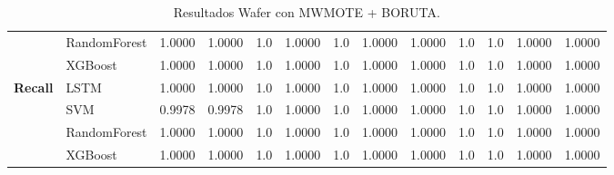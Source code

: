 \begin{table}[h]
\begin{adjustbox}{max width=13cm}
\begin{tabular}{|c|l|r|r|r|r|r|r|r|r|r|r|r|}
			& RandomForest &  1.0000 &  1.0000 &  1.0 &  1.0000 &  1.0 &  1.0000 &  1.0000 &  1.0 &  1.0 &  1.0000 &  1.0000 \\
			& XGBoost &  1.0000 &  1.0000 &  1.0 &  1.0000 &  1.0 &  1.0000 &  1.0000 &  1.0 &  1.0 &  1.0000 &  1.0000 \\
			\hline
			\textbf{Recall} & LSTM &  1.0000 &  1.0000 &  1.0 &  1.0000 &  1.0 &  1.0000 &  1.0000 &  1.0 &  1.0 &  1.0000 &  1.0000 \\
			& SVM &  0.9978 &  0.9978 &  1.0 &  1.0000 &  1.0 &  1.0000 &  1.0000 &  1.0 &  1.0 &  1.0000 &  1.0000 \\
			& RandomForest &  1.0000 &  1.0000 &  1.0 &  1.0000 &  1.0 &  1.0000 &  1.0000 &  1.0 &  1.0 &  1.0000 &  1.0000 \\
			& XGBoost &  1.0000 &  1.0000 &  1.0 &  1.0000 &  1.0 &  1.0000 &  1.0000 &  1.0 &  1.0 &  1.0000 &  1.0000 \\
			\hline
		\end{tabular}
	\end{adjustbox}
	\caption{Resultados Wafer con MWMOTE + BORUTA.}
	\label{tab:Wafer_MWMOTE_BORUTA}
\end{table}
